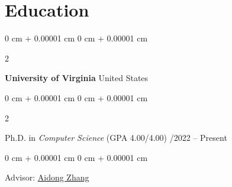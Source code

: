 \documentclass[10pt, letterpaper]{article}
\newenvironment{highlightsforbulletentries}{
    \begin{itemize}[
        topsep=0.10 cm,
        parsep=0.10 cm,
        partopsep=0pt,
        itemsep=0pt,
        leftmargin=10pt
    ]
}{
    \end{itemize}
} %
\newenvironment{onecolentry}{
    \begin{adjustwidth}{
        0 cm + 0.00001 cm
    }{
        0 cm + 0.00001 cm
    }
}{
    \end{adjustwidth}
} %
\newenvironment{twocolentry}[2][]{
    \onecolentry
    \def\secondColumn{#2}
    \setcolumnwidth{\fill, 4.5 cm}
    \begin{paracol}{2}
}{
    \switchcolumn \raggedleft \secondColumn
    \end{paracol}
    \endonecolentry
} %
\begin{document}
    
    \section{Education}        
        \begin{twocolentry}{
            United States
        }
            \textbf{University of Virginia}\end{twocolentry}

        \vspace{0.10 cm}
        \begin{twocolentry}{
            08/2022 – Present
        }
            Ph.D. in \textit{Computer Science} (GPA 4.00/4.00)\end{twocolentry}


        \begin{onecolentry}
            Advisor: \href{https://www.cs.virginia.edu/~az9eg/website/home.html}{Aidong Zhang}
        \end{onecolentry}



\end{document}
